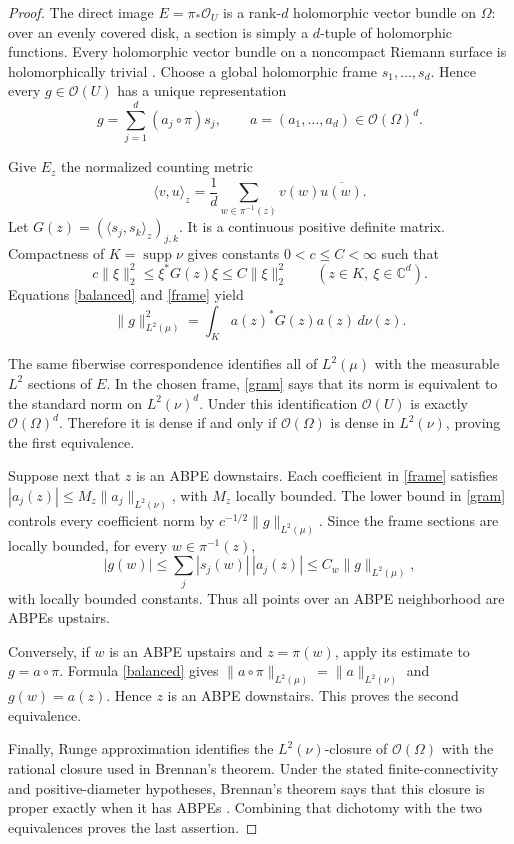 \documentclass[11pt]{article}
\newcommand{\OO}{\mathcal O}
\newcommand{\C}{\mathbb C}
\begin{document}
\begin{proof}
The direct image $E=\pi_*\OO_U$ is a rank-$d$ holomorphic vector bundle on
$\Omega$: over an evenly covered disk, a section is simply a $d$-tuple of
holomorphic functions. Every holomorphic vector bundle on a noncompact
Riemann surface is holomorphically trivial \cite[Section 30, in particular
Theorem 30.4]{Forster}. Choose a global holomorphic frame
$s_1,\ldots,s_d$. Hence every $g\in\OO(U)$ has a unique representation
\begin{equation}\label{frame}
 g=\sum_{j=1}^d (a_j\circ\pi)s_j,
 \qquad a=(a_1,\ldots,a_d)\in\OO(\Omega)^d.
\end{equation}

Give $E_z$ the normalized counting metric
\[
 \langle v,u\rangle_z=\frac1d
 \sum_{w\in\pi^{-1}(z)}v(w)\overline{u(w)}.
\]
Let $G(z)=(\langle s_j,s_k\rangle_z)_{j,k}$. It is a continuous positive
definite matrix. Compactness of $K=\operatorname{supp}\nu$ gives constants
$0<c\le C<\infty$ such that
\begin{equation}\label{gram}
 c\lVert\xi\rVert_2^2\le \xi^*G(z)\xi
 \le C\lVert\xi\rVert_2^2
 \qquad(z\in K,\ \xi\in\C^d).
\end{equation}
Equations \eqref{balanced} and \eqref{frame} yield
\begin{equation}\label{norm}
 \lVert g\rVert_{L^2(\mu)}^2
 =\int_K a(z)^*G(z)a(z)\,d\nu(z).
\end{equation}

The same fiberwise correspondence identifies all of $L^2(\mu)$ with the
measurable $L^2$ sections of $E$. In the chosen frame, \eqref{gram} says that
its norm is equivalent to the standard norm on $L^2(\nu)^d$. Under this
identification $\OO(U)$ is exactly $\OO(\Omega)^d$. Therefore it is dense if
and only if $\OO(\Omega)$ is dense in $L^2(\nu)$, proving the first
equivalence.

Suppose next that $z$ is an ABPE downstairs. Each coefficient in
\eqref{frame} satisfies
$|a_j(z)|\le M_z\lVert a_j\rVert_{L^2(\nu)}$, with $M_z$ locally bounded.
The lower bound in \eqref{gram} controls every coefficient norm by
$c^{-1/2}\lVert g\rVert_{L^2(\mu)}$. Since the frame sections are locally
bounded, for every $w\in\pi^{-1}(z)$,
\[
 |g(w)|\le \sum_j|s_j(w)|\,|a_j(z)|
 \le C_w\lVert g\rVert_{L^2(\mu)},
\]
with locally bounded constants. Thus all points over an ABPE neighborhood are
ABPEs upstairs.

Conversely, if $w$ is an ABPE upstairs and $z=\pi(w)$, apply its estimate to
$g=a\circ\pi$. Formula \eqref{balanced} gives
$\lVert a\circ\pi\rVert_{L^2(\mu)}=\lVert a\rVert_{L^2(\nu)}$ and
$g(w)=a(z)$. Hence $z$ is an ABPE downstairs. This proves the second
equivalence.

Finally, Runge approximation identifies the $L^2(\nu)$-closure of
$\OO(\Omega)$ with the rational closure used in Brennan's theorem. Under the
stated finite-connectivity and positive-diameter hypotheses, Brennan's
theorem says that this closure is proper exactly when it has ABPEs
\cite{Brennan,BP}. Combining that dichotomy with the two equivalences proves
the last assertion.
\end{proof}
\end{document}
